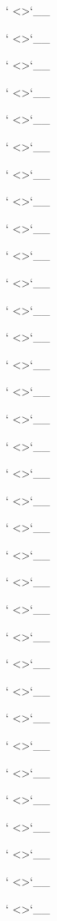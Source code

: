 \documentclass[letterpaper,12pt,english]{sphinxmanual}
\begin{document}
{}` \textless{}\textgreater{}{}`\_\_

{}` \textless{}\textgreater{}{}`\_\_

{}` \textless{}\textgreater{}{}`\_\_

{}` \textless{}\textgreater{}{}`\_\_

{}` \textless{}\textgreater{}{}`\_\_

{}` \textless{}\textgreater{}{}`\_\_

{}` \textless{}\textgreater{}{}`\_\_

{}` \textless{}\textgreater{}{}`\_\_

{}` \textless{}\textgreater{}{}`\_\_

{}` \textless{}\textgreater{}{}`\_\_

{}` \textless{}\textgreater{}{}`\_\_

{}` \textless{}\textgreater{}{}`\_\_

{}` \textless{}\textgreater{}{}`\_\_

{}` \textless{}\textgreater{}{}`\_\_

{}` \textless{}\textgreater{}{}`\_\_

{}` \textless{}\textgreater{}{}`\_\_

{}` \textless{}\textgreater{}{}`\_\_

{}` \textless{}\textgreater{}{}`\_\_

{}` \textless{}\textgreater{}{}`\_\_

{}` \textless{}\textgreater{}{}`\_\_

{}` \textless{}\textgreater{}{}`\_\_

{}` \textless{}\textgreater{}{}`\_\_

{}` \textless{}\textgreater{}{}`\_\_

{}` \textless{}\textgreater{}{}`\_\_

{}` \textless{}\textgreater{}{}`\_\_

{}` \textless{}\textgreater{}{}`\_\_

{}` \textless{}\textgreater{}{}`\_\_

{}` \textless{}\textgreater{}{}`\_\_

{}` \textless{}\textgreater{}{}`\_\_

{}` \textless{}\textgreater{}{}`\_\_

{}` \textless{}\textgreater{}{}`\_\_

{}` \textless{}\textgreater{}{}`\_\_

{}` \textless{}\textgreater{}{}`\_\_

{}` \textless{}\textgreater{}{}`\_\_
\end{document}
